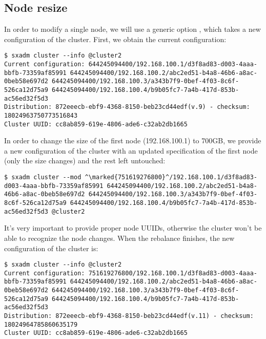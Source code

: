 \subsection{Node resize}
In order to modify a single node, we will use a generic option
, which takes a new configuration of the cluster.
First, we obtain the current configuration:
\begin{lstlisting}
$ sxadm cluster --info @cluster2
Current configuration: 644245094400/192.168.100.1/d3f8ad83-d003-4aaa-bbfb-73359af85991 644245094400/192.168.100.2/abc2ed51-b4a8-46b6-a8ac-0beb58e697d2 644245094400/192.168.100.3/a343b7f9-0bef-4f03-8c6f-526ca12d75a9 644245094400/192.168.100.4/b9b05fc7-7a4b-417d-853b-ac56ed32f5d3 
Distribution: 872eeecb-ebf9-4368-8150-beb23cd44edf(v.9) - checksum: 18024963750773516843
Cluster UUID: cc8ab859-619e-4806-ade6-c32ab2db1665
\end{lstlisting}
In order to change the size of the first node (192.168.100.1) to 700GB, we
provide a new configuration of the cluster with an updated specification of
the first node (only the size changes) and the rest left untouched:
\begin{lstlisting}
$ sxadm cluster --mod ^\marked{751619276800}^/192.168.100.1/d3f8ad83-d003-4aaa-bbfb-73359af85991 644245094400/192.168.100.2/abc2ed51-b4a8-46b6-a8ac-0beb58e697d2 644245094400/192.168.100.3/a343b7f9-0bef-4f03-8c6f-526ca12d75a9 644245094400/192.168.100.4/b9b05fc7-7a4b-417d-853b-ac56ed32f5d3 @cluster2
\end{lstlisting}
It's very important to provide proper node UUIDs, otherwise the cluster won't
be able to recognize the node changes. When the rebalance finishes, the new
configuration of the cluster is:
\begin{lstlisting}
$ sxadm cluster --info @cluster2
Current configuration: 751619276800/192.168.100.1/d3f8ad83-d003-4aaa-bbfb-73359af85991 644245094400/192.168.100.2/abc2ed51-b4a8-46b6-a8ac-0beb58e697d2 644245094400/192.168.100.3/a343b7f9-0bef-4f03-8c6f-526ca12d75a9 644245094400/192.168.100.4/b9b05fc7-7a4b-417d-853b-ac56ed32f5d3 
Distribution: 872eeecb-ebf9-4368-8150-beb23cd44edf(v.11) - checksum: 18024964785860635179
Cluster UUID: cc8ab859-619e-4806-ade6-c32ab2db1665
\end{lstlisting}

